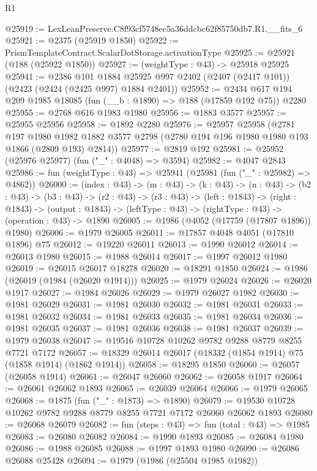 \begin{lexlean}{R1}
\begin{coremodule}
@25919 := LexLeanPreserve.C8f93cf5748ec5a36ddcbc62f85750db7.R1.__fits_6
@25921 := @2375 (@25919 @1850)
@25922 := PrismTemplateContract.ScalarDotStorage.activationType
@25925 := @25921 (@188 (@25922 @1850))
@25927 := (weightType : @43) -> @25918 @25925
@25941 := @2386
    @101
    @1884
    @25925
    @997
    @2402
    (@2407 (@2417 @101))
    (@2423 (@2424 (@2425 @997) @1884 @2401))
@25952 := @2434 @617 @194 @209 @1985 @18085 (fun (__b : @1890) => @188 (@17859 @192 @75)) @2280
@25955 := @2768 @616 @1983 @1980
@25956 := @1883 @3577
@25957 := @25955 @25956
@25958 := @1892 @2280
@25976 := @25957
    @25958
    (@2781
      @197
      @1980
      @1982
      @1882
      @3577
      @2798
      (@2780 @194 @196 @1980 @1980 @193 @1866 (@2809 @193) @2814))
@25977 := @2819 @192
@25981 := @25952 (@25976 @25977) (fun ("_" : @4048) => @3594)
@25982 := @4047 @2843
@25986 := fun (weightType : @43) => @25941 (@25981 (fun ("_" : @25982) => @4862))
@26000 := (index : @43) ->
  (m : @43) ->
  (k : @43) ->
  (n : @43) ->
  (b2 : @43) ->
  (b3 : @43) ->
  (r2 : @43) ->
  (r3 : @43) ->
  (left : @1843) ->
  (right : @1843) ->
  (output : @1843) -> (leftType : @43) -> (rightType : @43) -> (operation : @43) -> @1890
@26005 := @1986 (@4052 (@17759 (@17807 @1896)) @1980)
@26006 := @1979 @26005
@26011 := @17857 @4048 @4051 (@17810 @1896) @75
@26012 := @19220 @26011
@26013 := @1990 @26012
@26014 := @26013 @1980
@26015 := @1988 @26014
@26017 := @1997 @26012 @1980
@26019 := @26015 @26017 @18278
@26020 := @18291 @1850
@26024 := @1986 (@26019 (@1984 (@26020 @1914)))
@26025 := @1979 @26024
@26026 := @26020 @1917
@26027 := @1984 @26026
@26029 := @1979 @26027 @1982
@26030 := @1981 @26029
@26031 := @1981 @26030
@26032 := @1981 @26031
@26033 := @1981 @26032
@26034 := @1981 @26033
@26035 := @1981 @26034
@26036 := @1981 @26035
@26037 := @1981 @26036
@26038 := @1981 @26037
@26039 := @1979 @26038
@26047 := @19516 @10728 @10262 @9782 @9288 @8779 @8255 @7721 @7172
@26057 := @18329 @26014 @26017 (@18332 (@1854 @1914) @75 (@1858 @1914) (@1862 @1914))
@26058 := @18295 @1850
@26060 := @26057 (@26058 @1914)
@26061 := @26047 @26060
@26062 := @26058 @1917
@26064 := @26061 @26062 @1893
@26065 := @26039 @26064
@26066 := @1979 @26065
@26068 := @1875 (fun ("_" : @1873) => @1890)
@26079 := @19530 @10728 @10262 @9782 @9288 @8779 @8255 @7721 @7172 @26060 @26062 @1893
@26080 := @26068 @26079
@26082 := fun (steps : @43) => fun (total : @43) => @1985
@26083 := @26080 @26082
@26084 := @1990 @1893
@26085 := @26084 @1980
@26086 := @1988 @26085
@26088 := @1997 @1893 @1980
@26090 := @26086 @26088 @25428
@26094 := @1979 (@1986 (@25504 @1985 @1982))

\end{coremodule}
\end{lexlean}
